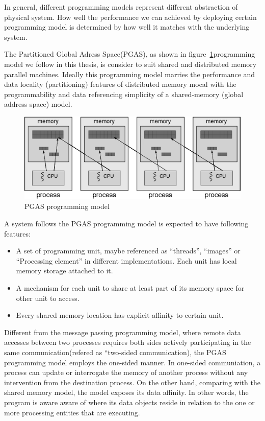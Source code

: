 In general, different programming models represent different abstraction of physical system. How well the performance we can achieved by deploying certain programming model is determined by how well it matches with the underlying system. 

The Partitioned Global Adress Space(PGAS), as shown in figure~\ref{fig:pgasmodel}programming model we follow in this thesis, is consider to suit shared and distributed memory parallel machines\cite{parallelencyclopedia}\cite{stitt2009introduction}\cite{yelick2007productivity}. Ideally this programming model marries the performance and data locality (partitioning) features of distributed memory mocal with the programmability and data referencing simplicity of a shared-memory (global address space) model. 
\begin{figure}
\centering
\label{fig:pgasmodel}
\includegraphics[scale=0.9]{figures/PGASdemo}
\caption{PGAS programming model}
\end{figure}
A system follows the PGAS programming model is expected to have following features:
\begin{itemize}
\item A set of programming unit, maybe referenced as ``threads'', ``images'' or ``Processing element'' in different implementations. Each unit has local memory storage attached to it.
\item A mechanism for each unit to share at least part of its memory space for other unit to access. 
\item Every shared memory location has explicit affinity to certain unit. 
\end{itemize}

Different from the message passing programming model, where remote data accesses between two processes requires both sides actively participating in the same communication(refered as ``two-sided communication), the PGAS programming model employs the one-sided manner. In one-sided communiation, a process can update or interrogate the memory of another process without any intervention from the destination process. On the other hand, comparing with the shared memory model, the model exposes its data affinity. In other words, the program is aware aware of where its data objects reside in relation to the one or more processing entities that are executing.

